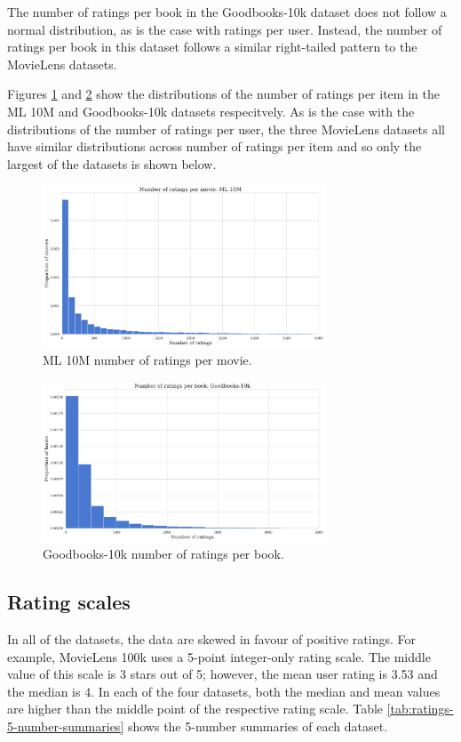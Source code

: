 The number of ratings per book in the Goodbooks-10k dataset does not follow a normal distribution, as is the case with ratings per user. Instead, the number of ratings per book in this dataset follows a similar right-tailed pattern to the MovieLens datasets.

Figures \ref{fig:ML10M-items} and \ref{fig:goodbooks-items} show the distributions of the number of ratings per item in the ML 10M and Goodbooks-10k datasets respecitvely. As is the case with the distributions of the number of ratings per user, the three MovieLens datasets all have similar distributions across number of ratings per item and so only the largest of the datasets is shown below.

\begin{figure}[H]
\centering
\includegraphics[width=0.75\textwidth]{Figures/3_ratings-distributions/ml_10m_movie-ratings.pdf}
\caption{ML 10M number of ratings per movie.}
\label{fig:ML10M-items}
\end{figure}

\begin{figure}[H]
\centering
\includegraphics[width=0.75\textwidth]{Figures/3_ratings-distributions/goodbooks-ratings.pdf}
\caption{Goodbooks-10k number of ratings per book.}
\label{fig:goodbooks-items}
\end{figure}

\subsection{Rating scales}
In all of the datasets, the data are skewed in favour of positive ratings. For example, MovieLens 100k uses a 5-point integer-only rating scale. The middle value of this scale is 3 stars out of 5; however, the mean user rating is 3.53 and the median is 4. In each of the four datasets, both the median and mean values are higher than the middle point of the respective rating scale. Table \ref{tab:ratings-5-number-summaries} shows the 5-number summaries of each dataset.

